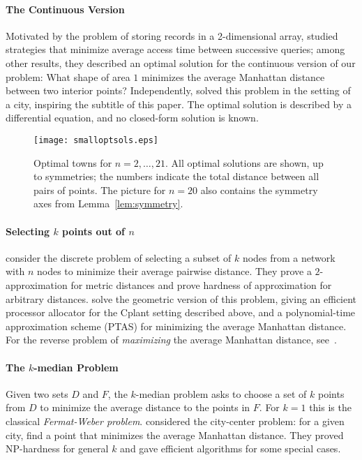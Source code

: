 \documentclass[preprint,authoryear,12pt]{elsarticle}
\begin{document}
\paragraph{The Continuous Version}
Motivated by the problem of storing records in a 2-dimensional
array, \cite{KarpMW75} studied strategies that minimize
average access time between successive queries; among other results,
they described an optimal solution for the continuous version of our
problem: What shape of area $1$ minimizes the average Manhattan
distance between two interior points? Independently,
\cite{Bender03whatis} solved this problem in the setting of a city,
inspiring the subtitle of this paper. The optimal solution is
described by a differential equation, and no closed-form solution is
known.


\begin{figure}[tb]
\begin{center}
  \texttt{[image: smalloptsols.eps]}
  \caption{Optimal towns for $n=2,\ldots,21$.  All optimal solutions
    are shown, up to symmetries; the numbers indicate the total
    distance between all pairs of points. The picture for $n=20$ also
    contains the symmetry axes from Lemma~\ref{lem:symmetry}. }
\label{fig:smalltowns}
\end{center}
\end{figure}

\paragraph{Selecting $k$ points out of $n$}
\cite{krumke97} consider the discrete problem of selecting a subset
of $k$ nodes from a network with $n$ nodes to minimize their average
pairwise distance. They prove a $2$-approximation for metric
distances and prove hardness of approximation for arbitrary
distances.
\cite{bender08} solve the geometric version
of this problem, giving an efficient processor allocator for the Cplant setting
described above, and a polynomial-time approximation scheme (PTAS) for minimizing the
average Manhattan distance.
For the reverse problem of {\em maximizing} the
average Manhattan distance, see~\cite{fm-mdgmwc-04}.


\paragraph{The $k$-median Problem}
Given two sets $D$ and $F$, the $k$-median problem asks to choose a
set of $k$ points from $D$ to minimize the average distance to the
points in $F$. For $k=1$ this is the classical {\em Fermat-Weber
problem}.
\cite{Fekete00,fmb-cfwp-05} considered the city-center problem: for
a given city, find a point that minimizes the average Manhattan
distance.
They proved NP-hardness for general $k$ and
gave efficient algorithms for some special cases.
\end{document}
